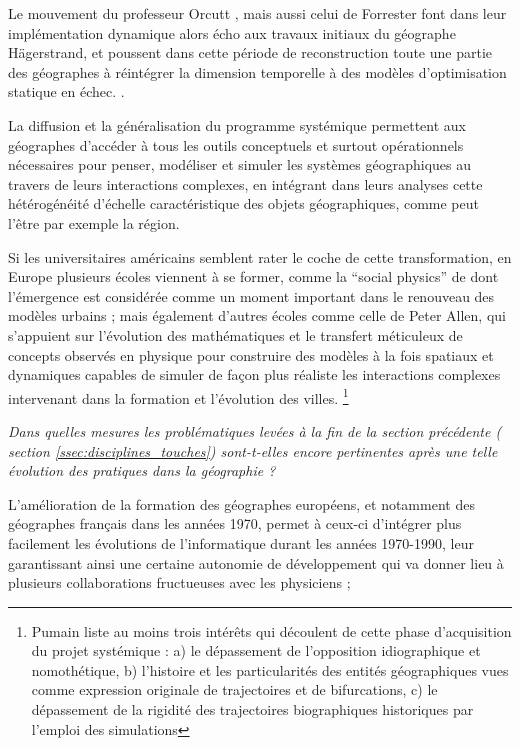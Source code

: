 Le mouvement du professeur Orcutt \autocite{Orcutt1957}, mais aussi celui de Forrester \autocite{Forrester1961, Forrester1969} font dans leur implémentation dynamique alors écho aux travaux initiaux du géographe Hägerstrand, et poussent dans cette période de reconstruction toute une partie des géographes à réintégrer la dimension temporelle à des modèles d'optimisation statique en échec. \autocite[p295]{Batty1976}.

La diffusion et la généralisation du programme systémique permettent aux géographes d'accéder à tous les outils conceptuels et surtout opérationnels \autocite{Forrester1969} nécessaires pour penser, modéliser et simuler les systèmes géographiques au travers de leurs interactions complexes, en intégrant dans leurs analyses cette hétérogénéité d'échelle caractéristique des objets géographiques, comme peut l'être par exemple la région.

Si les universitaires américains semblent rater le coche de cette transformation, en Europe plusieurs écoles viennent à se former, comme la \foreignquote{english}{social physics} de \autocite{Wilson1970} dont l'émergence est considérée comme un moment important dans le renouveau des modèles urbains \autocite{Griffith2010}; mais également d'autres écoles comme celle de Peter Allen, qui s'appuient sur l'évolution des mathématiques et le transfert méticuleux de concepts observés en physique pour construire des modèles à la fois spatiaux et dynamiques capables de simuler de façon plus réaliste les interactions complexes intervenant dans la formation et l'évolution des villes. \autocite[11]{Batty1976, Batty2001} \autocite[27-28]{Pumain2003} \footnote{ Pumain liste au moins trois intérêts qui découlent de cette phase d'acquisition du projet systémique : a) le dépassement de l'opposition idiographique et nomothétique, b) l'histoire et les particularités des entités géographiques vues comme expression originale de trajectoires et de bifurcations, c) le dépassement de la rigidité des trajectoires biographiques historiques par l'emploi des simulations}

\textit{Dans quelles mesures les problématiques levées à la fin de la section précédente ( section \ref{ssec:disciplines_touches}) sont-t-elles encore pertinentes après une telle évolution des pratiques dans la géographie ? }

L'amélioration de la formation des géographes européens, et notamment des géographes français dans les années 1970, permet à ceux-ci d'intégrer plus facilement les évolutions de l'informatique durant les années 1970-1990, leur garantissant ainsi une certaine autonomie de développement qui va donner lieu à plusieurs collaborations fructueuses avec les physiciens \autocite{Pumain1984}; 

